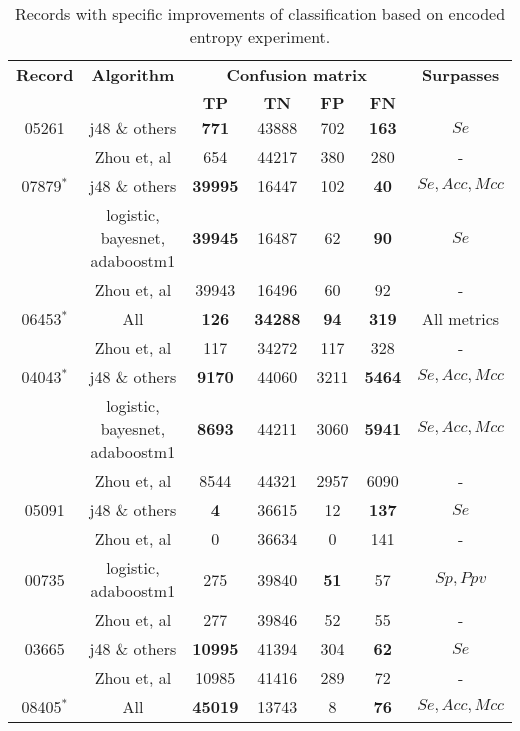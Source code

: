 \begin{table}[h]
\begin{center}
\begin{threeparttable}
\caption{Records with specific improvements of classification based on encoded entropy experiment.}
\label{table:overview_global_encoded}
\scriptsize
  \begin{tabular}{c c c c c c c}
  \toprule
  \textbf{Record} & \textbf{Algorithm} & \multicolumn{4}{c}{\textbf{Confusion matrix}} & \textbf{Surpasses}\\
  \cline{3-6}
  \\
  & & $\mathbf{TP}$ & $\mathbf{TN}$ & $\mathbf{FP}$ & $\mathbf{FN}$\\
  \midrule  
  05261 & j48 \& others & \textbf{771} & 43888 & 702 & \textbf{163} & $Se$\\
  & Zhou et, al & 654 & 44217 & 380 & 280 & -\\
  \hline
  07879$^*$ & j48 \& others & \textbf{39995} & 16447 & 102 & \textbf{40} & $Se, Acc, Mcc$ \\
  & logistic, bayesnet, adaboostm1 & \textbf{39945} & 16487 & 62 & \textbf{90}  & $Se$\\
  & Zhou et, al & 39943 & 16496 & 60 & 92 & -\\
  \hline
  06453$^*$ & All & \textbf{126} & \textbf{34288} & \textbf{94} & \textbf{319} & All metrics \\
  & Zhou et, al & 117 & 34272 & 117 & 328 & -\\
  \hline
  04043$^*$ & j48 \& others & \textbf{9170} & 44060 & 3211 & \textbf{5464} & $Se, Acc, Mcc$ \\
  & logistic, bayesnet, adaboostm1 & \textbf{8693} & 44211 & 3060 & \textbf{5941} & $Se, Acc, Mcc$ \\
  & Zhou et, al & 8544 & 44321 & 2957 & 6090 & - \\
  \hline
  05091 & j48 \& others & \textbf{4} & 36615 & 12 & \textbf{137} & $Se$ \\
  & Zhou et, al & 0 & 36634 & 0 & 141 & - \\
  \hline
  00735 & logistic, adaboostm1 & 275 & 39840 & \textbf{51} & 57 & $Sp, Ppv$ \\
  & Zhou et, al & 277 & 39846 & 52 & 55 & - \\
  \hline
  03665 & j48 \& others & \textbf{10995} & 41394 & 304 & \textbf{62} & $Se$ \\
  & Zhou et, al & 10985 & 41416 & 289 & 72 & - \\
  \hline
  08405$^*$ & All & \textbf{45019} & 13743 & 8 & \textbf{76} & $Se, Acc, Mcc$ \\

\end{tabular}
\end{threeparttable}
\end{center}
\end{table}
